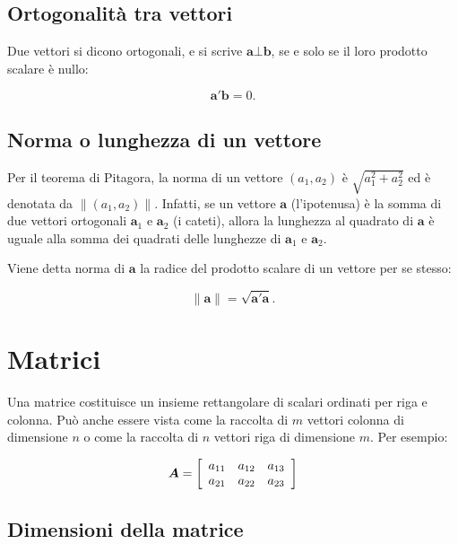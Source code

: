 \documentclass[
  11pt,
]{krantz}
\theoremstyle{definition}
\theoremstyle{definition}
\theoremstyle{definition}
\theoremstyle{definition}
\theoremstyle{remark}
\begin{document}
\hypertarget{ortogonalituxe0-tra-vettori}{%
\subsection{Ortogonalità tra vettori}\label{ortogonalituxe0-tra-vettori}}

Due vettori si dicono ortogonali, e si scrive \(\boldsymbol{a} \bot \boldsymbol{b}\), se e solo se il loro prodotto scalare è nullo:

\[\boldsymbol{a}'\boldsymbol{b} = 0.\]

\hypertarget{norma-o-lunghezza-di-un-vettore}{%
\subsection{Norma o lunghezza di un vettore}\label{norma-o-lunghezza-di-un-vettore}}

Per il teorema di Pitagora, la norma di un vettore \((a_1, a_2)\) è \(\sqrt{a_1^2 + a_2^2}\) ed è denotata da \(\| (a_1, a_2) \|\). Infatti, se un vettore \(\boldsymbol{a}\) (l'ipotenusa) è la somma di due vettori ortogonali \(\boldsymbol{a}_1\) e \(\boldsymbol{a}_2\) (i cateti), allora la lunghezza al quadrato di \(\boldsymbol{a}\) è uguale alla somma dei quadrati delle lunghezze di \(\boldsymbol{a}_1\) e \(\boldsymbol{a}_2\).

Viene detta norma di \(\boldsymbol{a}\) la radice del prodotto scalare di un vettore per se stesso:

\[\| \boldsymbol{a} \| = \sqrt{\boldsymbol{a}'\boldsymbol{a}}.\]

\hypertarget{matrici}{%
\section{Matrici}\label{matrici}}

Una matrice costituisce un insieme rettangolare di scalari ordinati per riga e colonna. Può anche essere vista come la raccolta di \(m\) vettori colonna di dimensione \(n\) o come la raccolta di \(n\) vettori riga di dimensione \(m\). Per esempio:

\[\boldsymbol{A} =  \left[ \begin{array}{c c c}
a_{11} & a_{12} & a_{13}\\
a_{21} & a_{22} & a_{23} \end{array} \right]\]

\hypertarget{dimensioni-della-matrice}{%
\subsection{Dimensioni della matrice}\label{dimensioni-della-matrice}}
\end{document}
